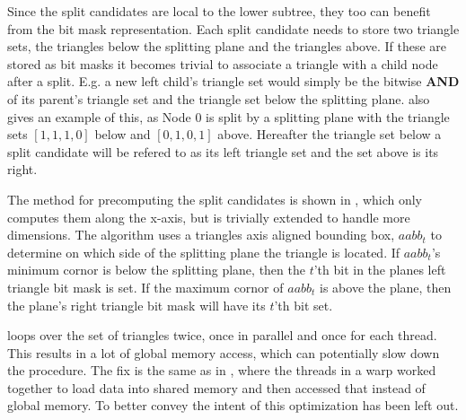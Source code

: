 
Since the split candidates are local to the lower subtree, they too can benefit
from the bit mask representation. Each split candidate needs to store two
triangle sets, the triangles below the splitting plane and the triangles
above. If these are stored as bit masks it becomes trivial to associate a
triangle with a child node after a split. E.g. a new left child's triangle set
would simply be the bitwise \textbf{AND} of its parent's triangle set and the
triangle set below the splitting plane.  also gives an
example of this, as Node 0 is split by a splitting plane with the triangle sets
$[1,1,1,0]$ below and $[0,1,0,1]$ above. Hereafter the triangle set below a
split candidate will be refered to as its left triangle set and the set above is
its right.

The method for precomputing the split candidates is shown in
, which only computes them along the x-axis, but
is trivially extended to handle more dimensions. The algorithm uses a triangles
axis aligned bounding box, $aabb_t$ to determine on which side of the splitting
plane the triangle is located. If $aabb_t$'s minimum cornor is below the
splitting plane, then the $t$'th bit in the planes left triangle bit mask is
set. If the maximum cornor of $aabb_t$ is above the plane, then the plane's
right triangle bit mask will have its $t$'th bit set.


 loops over the set of triangles twice, once in
parallel and once for each thread. This results in a lot of global memory
access, which can potentially slow down the procedure. The fix is the same as in
, where the threads in a warp worked together to
load data into shared memory and then accessed that instead of global memory. To
better convey the intent of  this optimization
has been left out.


